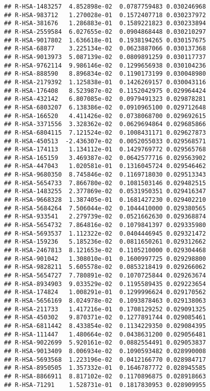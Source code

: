 \documentclass[
]{article}
\begin{document}
\begin{verbatim}
## R-HSA-1483257  4.852898e-02  0.0787759483 0.030246968
## R-HSA-983712   1.270028e-01  0.1572407718 0.030237972
## R-HSA-381676   1.286883e-01  0.1589221823 0.030233894
## R-HSA-2559584  6.027655e-02  0.0904868448 0.030210297
## R-HSA-9017802  1.636618e-01  0.1938194265 0.030157675
## R-HSA-68877    3.225134e-02  0.0623887066 0.030137368
## R-HSA-9013973  5.087139e-02  0.0809891259 0.030117737
## R-HSA-9762114  9.986146e-02  0.1299656938 0.030104236
## R-HSA-888590   8.896834e-02  0.1190173199 0.030048980
## R-HSA-2179392  1.125838e-01  0.1426269157 0.030043116
## R-HSA-176408   8.523987e-02  0.1152042975 0.029964424
## R-HSA-432142   6.807085e-02  0.0979491323 0.029878281
## R-HSA-6803207  6.138386e-02  0.0910965100 0.029712648
## R-HSA-166520   4.411426e-02  0.0738068700 0.029692615
## R-HSA-3371556  3.328362e-02  0.0629694864 0.029685866
## R-HSA-6804115  7.121524e-02  0.1008431171 0.029627873
## R-HSA-450513  -2.436307e-02  0.0052055033 0.029568571
## R-HSA-174113   1.134112e-01  0.1429769772 0.029565768
## R-HSA-165159   3.469387e-02  0.0642577716 0.029563902
## R-HSA-447043   1.020581e-01  0.1316045724 0.029546462
## R-HSA-9680350  8.745846e-02  0.1169718030 0.029513343
## R-HSA-5654733  7.866780e-02  0.1081503146 0.029482515
## R-HSA-1483255  2.377869e-02  0.0531950351 0.029416347
## R-HSA-9668328  1.387405e-01  0.1681427230 0.029402210
## R-HSA-5684264  7.506044e-02  0.1044410000 0.029380565
## R-HSA-933541   2.279739e-02  0.0521662630 0.029368874
## R-HSA-5654732  7.864816e-02  0.1079841397 0.029335980
## R-HSA-5693537  1.112322e-02  0.0404446945 0.029321472
## R-HSA-159236   5.185236e-02  0.0811650261 0.029312662
## R-HSA-2467813  8.121653e-02  0.1105210000 0.029304468
## R-HSA-901042   1.308010e-01  0.1600997725 0.029298800
## R-HSA-9828211  5.605578e-02  0.0853218419 0.029266062
## R-HSA-5654727  7.780891e-02  0.1070725844 0.029263674
## R-HSA-8934903  9.033529e-02  0.1195589435 0.029223654
## R-HSA-174824   1.008291e-01  0.1299996624 0.029170562
## R-HSA-5656169  8.024978e-02  0.1093878463 0.029138063
## R-HSA-211733   1.417216e-01  0.1708129252 0.029091325
## R-HSA-450302   9.870371e-02  0.1277891744 0.029085461
## R-HSA-6811442  8.433854e-02  0.1134229350 0.029084395
## R-HSA-111447   1.480664e-02  0.0438631200 0.029056481
## R-HSA-9022699  5.920161e-02  0.0882554491 0.029053837
## R-HSA-9013409  8.006934e-02  0.1090593482 0.028990008
## R-HSA-5693568  1.223196e-02  0.0412166770 0.028984717
## R-HSA-8950505  1.357332e-01  0.1646787772 0.028945585
## R-HSA-8866911  8.817102e-02  0.1170896875 0.028918663
## R-HSA-71291    1.528731e-01  0.1817830953 0.028909955

\end{verbatim}
\end{document}

